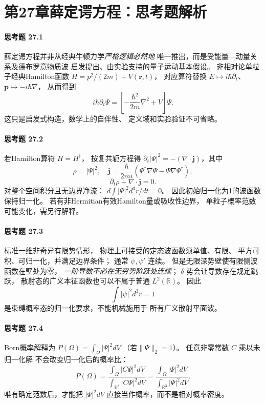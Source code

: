\section*{第27章\quad 薛定谔方程：思考题解析}
\paragraph{思考题 27.1}
薛定谔方程并非从经典牛顿力学\emph{严格逻辑必然地}
唯一推出，而是受能量—动量关系及德布罗意物质波
启发提出、由实验支持的量子运动基本假设。
非相对论单粒子经典Hamilton函数
\(H=p^2/(2m)+V(\boldsymbol r,t)\)，
对应算符替换
\(E\mapsto i\hbar\partial_t\)、
\(\boldsymbol p\mapsto-i\hbar\nabla\)，
从而得到
\[
\boxed{i\hbar\partial_t\Psi=
\left[-\frac{\hbar^2}{2m}\nabla^2+V\right]\Psi}.
\]
这只是启发式构造，数学上的自伴性、
定义域和实验验证不可省略。

\paragraph{思考题 27.2}
若Hamilton算符 \(H=H^\dagger\)，
按复共轭方程得
\(\partial_t|\Psi|^2=
-(\nabla\cdot\boldsymbol j)\)，其中
\[
\boxed{\rho=|\Psi|^2,\quad
\boldsymbol j=\frac{\hbar}{2mi}
(\Psi^*\nabla\Psi-\Psi\nabla\Psi^*)},
\]
\[
\boxed{\partial_t\rho+\nabla\cdot\boldsymbol j=0}.
\]
对整个空间积分且无边界净流：
\(d\int|\Psi|^2d^3r/dt=0\)。
因此初始归一化为1的波函数保持归一化。
若有非Hermitian有效Hamilton量或吸收性边界，
单粒子概率范数可能变化，需另行解释。

\paragraph{思考题 27.3}
标准一维非奇异有限势情形，
物理上可接受的定态波函数须单值、有限、
平方可积、可归一化，并满足边界条件；
通常 \(\psi,\psi'\) 连续。
但是无限深势壁使有限侧波函数在壁处为零，
\emph{一阶导数不必在无穷势阶跃处连续}；
\(\delta\) 势会让导数存在规定跳跃，
散射态的广义本征函数也可以不属于普通
\(L^2(\mathbb R)\)。
因此
\[
\boxed{\int|\psi|^2d^3r=1}
\]
是束缚概率态的归一化要求，不能机械施用于
所有广义散射平面波。

\paragraph{思考题 27.4}
Born概率解释为
\(P(\Omega)=\int_\Omega|\Psi|^2dV\)
（若\(\|\Psi\|_2=1\)）。
任意非零常数 \(C\) 乘以未归一化解
不会改变归一化后的概率比：
\[
P(\Omega)=
\frac{\int_\Omega|C\Psi|^2dV}
{\int_{\mathbb R^3}|C\Psi|^2dV}
=\frac{\int_\Omega|\Psi|^2dV}
{\int_{\mathbb R^3}|\Psi|^2dV}.
\]
唯有确定范数后，才能把 \(|\Psi|^2dV\)
直接当作概率，而不是相对概率密度。

